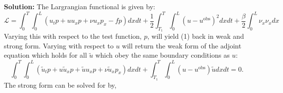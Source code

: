 \documentclass[11pt]{article}
\newenvironment{solution}{\begin{trivlist}\item[]{\bf Solution:}}
                      {\end{trivlist}}
\begin{document}
\begin{enumerate}
\begin{solution}
The Largrangian functional is given by: 
\begin{equation}
\mathcal{L} = \int_0^T \int_0^L (u_t p + u u_x p + \nu u_{x} p_x - f p) dx dt
+ \frac{1}{2}\int_{T_1}^T\int_0^L(u-u^{\text{obs}})^2dxdt  
+ \frac{\beta}{2} \int_0^L \nu_x \nu_x dx  
\label{lagrangian}
\end{equation}
Varying this with respect to the test function, $p$, will yield (1) back
 in weak and strong form. Varying with respect to $u$ will return the
 weak form of the adjoint equation which holds for all $\tilde{u}$ which
 obey the same boundary conditions as $u$:  
\begin{equation}
\int_0^T\int_0^L\left(\tilde{u}_t p + u\tilde{u}_x p + \tilde{u}u_x p 
		 + \nu\tilde{u}_x p_x\right)dxdt  
+ \int_{T_1}^T\int_0^L(u-u^{\text{obs}})\tilde{u}dxdt = 0.
\end{equation}
The strong form can be solved for by, 

\end{solution}
\end{enumerate}



%
%
%
%
%
%

\newpage
\end{document}
